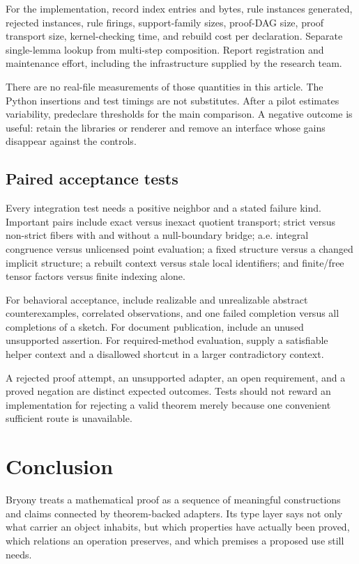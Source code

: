 \documentclass[11pt,a4paper]{article}
\theoremstyle{definition}\newtheorem{definition}[theorem]{Definition}
\theoremstyle{remark}\newtheorem{remark}[theorem]{Remark}
\begin{document}
For the implementation, record index entries and bytes, rule instances generated, rejected instances, rule firings, support-family sizes, proof-DAG size, proof transport size, kernel-checking time, and rebuild cost per declaration. Separate single-lemma lookup from multi-step composition. Report registration and maintenance effort, including the infrastructure supplied by the research team.

There are no real-file measurements of those quantities in this article. The Python insertions and test timings are not substitutes. After a pilot estimates variability, predeclare thresholds for the main comparison. A negative outcome is useful: retain the libraries or renderer and remove an interface whose gains disappear against the controls.

\subsection{Paired acceptance tests}
Every integration test needs a positive neighbor and a stated failure kind. Important pairs include exact versus inexact quotient transport; strict versus non-strict fibers with and without a null-boundary bridge; a.e. integral congruence versus unlicensed point evaluation; a fixed structure versus a changed implicit structure; a rebuilt context versus stale local identifiers; and finite/free tensor factors versus finite indexing alone.

For behavioral acceptance, include realizable and unrealizable abstract counterexamples, correlated observations, and one failed completion versus all completions of a sketch. For document publication, include an unused unsupported assertion. For required-method evaluation, supply a satisfiable helper context and a disallowed shortcut in a larger contradictory context.

A rejected proof attempt, an unsupported adapter, an open requirement, and a proved negation are distinct expected outcomes. Tests should not reward an implementation for rejecting a valid theorem merely because one convenient sufficient route is unavailable.

\section{Conclusion}\label{sec:conclusion}
Bryony treats a mathematical proof as a sequence of meaningful constructions and claims connected by theorem-backed adapters. Its type layer says not only what carrier an object inhabits, but which properties have actually been proved, which relations an operation preserves, and which premises a proposed use still needs.
\end{document}
